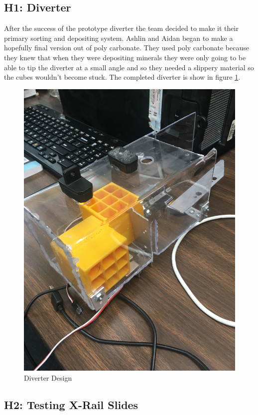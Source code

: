 \documentclass{article}
\begin{document}
\subsection{H1: Diverter}

After the success of the prototype diverter the team decided to make it their primary sorting and depositing system. Ashlin and Aidan began to make a hopefully final version out of poly carbonate. They used poly carbonate because they knew that when they were depositing minerals they were only going to be able to tip the diverter at a small angle and so they needed a slippery material so the cubes wouldn't become stuck. The completed diverter is show in figure  \ref{fig:diverter}.

\begin{figure}
    \centering
    \includegraphics[width=.6 \textwidth]{15_12-10/images/Diverter.jpg}
    \caption{Diverter Design}
    \label{fig:diverter}
\end{figure}

\subsection{H2: Testing X-Rail Slides}
\end{document}
